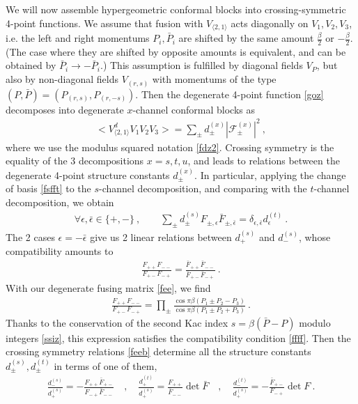 \documentclass[12pt, a4paper]{article}
\theoremstyle{break}
\begin{document}
We will now assemble hypergeometric conformal blocks into crossing-symmetric 4-point functions. We assume that fusion with $V_{\langle 2,1\rangle}$ acts diagonally on $V_1,V_2,V_3$, i.e. the left and right momentums $P_i,\bar P_i$ are shifted by the same amount $\frac{\beta}{2}$ or $-\frac{\beta}{2}$. (The case where they are shifted by opposite amounts is equivalent, and can be obtained by $\bar P_i\to -\bar P_i$.) This assumption is fulfilled by diagonal fields $V_P$, but also by non-diagonal fields $V_{(r,s)}$ with momentums of the type $(P,\bar P)= (P_{(r,s)},P_{(r,-s)})$. 
Then the degenerate 4-point function \eqref{goz} decomposes into degenerate $x$-channel conformal blocks as 
\begin{align}
 \Big<V_{\langle 2,1\rangle}^dV_{1}V_{2}V_{3}\Big> 
 = \sum_\pm d^{(x)}_\pm \left|\mathcal{F}^{(x)}_\pm \right|^2  
 \ ,
\end{align}
where we use the modulus squared notation \eqref{fdz2}.
Crossing symmetry is the equality of the 3 decompositions $x=s,t,u$, and leads to relations between the degenerate 4-point structure constants $d^{(x)}_\pm$. In particular, applying the change of basis \eqref{fsfft} to the $s$-channel decomposition, and comparing with the $t$-channel decomposition, we obtain 
\begin{align}
 \forall \epsilon,\bar\epsilon \in \{+,-\}\ , \qquad \sum_\pm d_\pm^{(s)} F_{\pm,\epsilon}\bar F_{\pm, \bar\epsilon} = \delta_{\epsilon,\bar\epsilon} d_\epsilon^{(t)}\ . 
 \label{feeb}
\end{align}
The 2 cases $\epsilon = -\bar\epsilon$ give us 2 linear relations between $d^{(s)}_+$ and $d^{(s)}_-$, whose compatibility amounts to 
\begin{align}
 \frac{F_{++}F_{--}}{F_{+-}F_{-+}} = \frac{\bar F_{++}\bar F_{--}}{\bar F_{+-}\bar F_{-+}}\ .
 \label{ffff}
\end{align}
With our degenerate fusing matrix \eqref{fee}, we find 
\begin{align}
 \frac{F_{++}F_{--}}{F_{+-}F_{-+}} = \prod_\pm \frac{\cos \pi \beta(P_1\pm P_2-P_3)}{\cos \pi \beta(P_1\pm P_2+P_3)}\ . 
\end{align}
Thanks to the conservation of the second Kac index $s=\beta(\bar P-P)$ modulo integers \eqref{ssiz}, this expression satisfies the compatibility condition \eqref{ffff}. Then the crossing symmetry relations \eqref{feeb} determine all the structure constants $d^{(s)}_\pm,d^{(t)}_\pm$ in terms of one of them,
\begin{align}
 \frac{d^{(s)}_-}{d^{(s)}_+} = -\frac{F_{++}\bar F_{+-}}{F_{-+}\bar F_{--}}\quad , \quad 
 \frac{d^{(t)}_+}{d^{(s)}_+} = \frac{F_{++}}{\bar F_{--}} \det \bar F \quad , \quad 
 \frac{d^{(t)}_-}{d^{(s)}_+} = -\frac{\bar F_{+-}}{F_{-+}} \det F\ .
\end{align}
\end{document}
